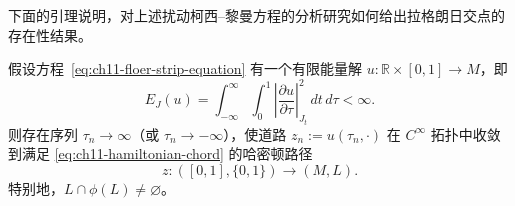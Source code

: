 下面的引理说明，对上述扰动柯西--黎曼方程的分析研究如何给出拉格朗日交点的存在性结果。

\begin{lemma}\label{lem:ch11-finite-energy-implies-intersection}
假设方程~\eqref{eq:ch11-floer-strip-equation} 有一个有限能量解
$u:\mathbb R\times[0,1]\to M$，即
\begin{equation}
 E_J(u)=\int_{-\infty}^{\infty}\int_0^1
 \left|\frac{\partial u}{\partial\tau}\right|_{J_t}^2
 \,dt\,d\tau<\infty.
 \label{eq:ch11-finite-strip-energy}
\end{equation}
则存在序列 $\tau_n\to\infty$（或 $\tau_n\to-\infty$），使道路
$z_n:=u(\tau_n,\mathord\cdot)$ 在 $C^\infty$ 拓扑中收敛到满足
\eqref{eq:ch11-hamiltonian-chord} 的哈密顿路径
\[
 z:([0,1],\{0,1\})\longrightarrow(M,L).
\]
特别地，$L\cap\phi(L)\ne\varnothing$。
\end{lemma}

